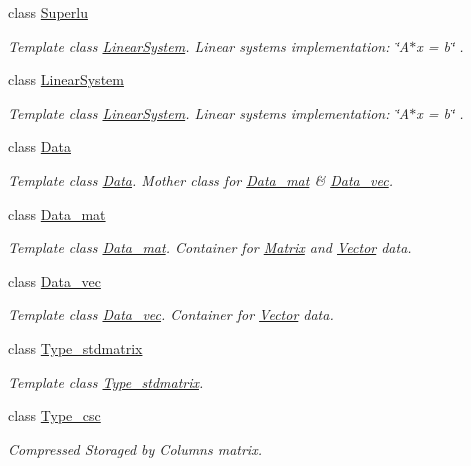 \begin{DoxyCompactItemize}
class \hyperlink{classlmx_1_1Superlu}{Superlu}
\begin{DoxyCompactList}\small\item\em Template class \hyperlink{classlmx_1_1LinearSystem}{Linear\-System}. Linear systems implementation\-: \char`\"{}\-A$\ast$x = b\char`\"{} . \end{DoxyCompactList}\item 
class \hyperlink{classlmx_1_1LinearSystem}{Linear\-System}
\begin{DoxyCompactList}\small\item\em Template class \hyperlink{classlmx_1_1LinearSystem}{Linear\-System}. Linear systems implementation\-: \char`\"{}\-A$\ast$x = b\char`\"{} . \end{DoxyCompactList}\item 
class \hyperlink{classlmx_1_1Data}{Data}
\begin{DoxyCompactList}\small\item\em Template class \hyperlink{classlmx_1_1Data}{Data}. Mother class for \hyperlink{classlmx_1_1Data__mat}{Data\-\_\-mat} \& \hyperlink{classlmx_1_1Data__vec}{Data\-\_\-vec}. \end{DoxyCompactList}\item 
class \hyperlink{classlmx_1_1Data__mat}{Data\-\_\-mat}
\begin{DoxyCompactList}\small\item\em Template class \hyperlink{classlmx_1_1Data__mat}{Data\-\_\-mat}. Container for \hyperlink{classlmx_1_1Matrix}{Matrix} and \hyperlink{classlmx_1_1Vector}{Vector} data. \end{DoxyCompactList}\item 
class \hyperlink{classlmx_1_1Data__vec}{Data\-\_\-vec}
\begin{DoxyCompactList}\small\item\em Template class \hyperlink{classlmx_1_1Data__vec}{Data\-\_\-vec}. Container for \hyperlink{classlmx_1_1Vector}{Vector} data. \end{DoxyCompactList}\item 
class \hyperlink{classlmx_1_1Type__stdmatrix}{Type\-\_\-stdmatrix}
\begin{DoxyCompactList}\small\item\em Template class \hyperlink{classlmx_1_1Type__stdmatrix}{Type\-\_\-stdmatrix}. \end{DoxyCompactList}\item 
class \hyperlink{classlmx_1_1Type__csc}{Type\-\_\-csc}
\begin{DoxyCompactList}\small\item\em Compressed Storaged by Columns matrix. \end{DoxyCompactList}\item 

\end{DoxyCompactItemize}
